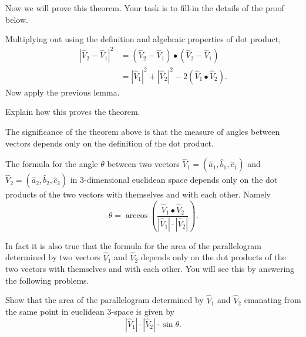 \documentclass{ximera}
\begin{document}
Now we will prove this theorem. Your task is to fill-in the details of
the proof below.

\begin{problem}
Multiplying out using the definition and algebraic properties of dot product,%
\begin{align*}
\left\vert \hat{V}_{2}-\hat{V}_{1}\right\vert ^{2}  &  =\left(  \hat{V}%
_{2}-\hat{V}_{1}\right)  \bullet\left(  \hat{V}_{2}-\hat{V}_{1}\right) \\
&  =\left\vert \hat{V}_{1}\right\vert ^{2}+\left\vert \hat{V}_{2}\right\vert
^{2}-2\left(  \hat{V}_{1}\bullet\hat{V}_{2}\right)  .
\end{align*}
Now apply the previous lemma.

Explain how this proves the theorem. 
\end{problem}

The significance of the theorem above is that the measure of angles between
vectors depends only on the definition of the dot product.

\begin{corollary}
The formula for the angle $\theta$ between two vectors $\hat{V}_{1}=\left(
\hat{a}_{1},\hat{b}_{1},\hat{c}_{1}\right)  $ and $\hat{V}_{2}=\left(  \hat
{a}_{2},\hat{b}_{2},\hat{c}_{2}\right)  $ in $3$-dimensional euclidean space
depends only on the dot products of the two vectors with themselves and with
each other. Namely%
\[
\theta=\arccos\left(  \frac{\hat{V}_{1}\bullet\hat{V}_{2}%
}{\left\vert \hat{V}_{1}\right\vert \cdot\left\vert \hat{V}_{2}\right\vert
}\right)  .
\]

\end{corollary}

In fact it is also true that the formula for the area of the parallelogram
determined by two vectors $\hat{V}_{1}$ and $\hat{V}_{2}$ depends only on the
dot products of the two vectors with themselves and with each other. You will
see this by answering the following problems.

\begin{problem}
Show that the area of the parallelogram determined by $\hat{V}_{1}$ and
$\hat{V}_{2}$ emanating from the same point in euclidean $3$-space is given by%
\[
|\hat{V}_{1}|\cdot|\hat{V}_{2}|\cdot\sin\theta.
\]
\end{problem}
\end{document}
